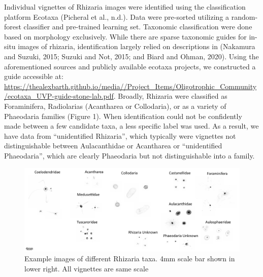 \documentclass[
]{article}
\begin{document}
Individual vignettes of Rhizaria images were identified using the
classification platform Ecotaxa (Picheral et al., n.d.). Data were
pre-sorted utilizing a random-forest classifier and pre-trained learning
set. Taxonomic classification were done based on morphology exclusively.
While there are sparse taxonomic guides for in-situ images of rhizaria,
identification largely relied on descriptions in (Nakamura and Suzuki,
2015; Suzuki and Not, 2015; and Biard and Ohman, 2020). Using the
aforementioned sources and publicly available ecotaxa projects, we
constructed a guide accessible at:
\url{https://thealexbarth.github.io/media//Project_Items/Oligotrophic_Community/ecotaxa_UVP-guide-stone-lab.pdf}.
Broadly, Rhizaria were classified as Foraminifera, Radiolarias
(Acantharea or Collodaria), or as a variety of Phaeodaria families
(Figure 1). When identification could not be confidently made between a
few candidate taxa, a less specific label was used. As a result, we have
data from ``unidentified Rhizaria'', which typically were vignettes not
distinguishable between Aulacanthidae or Acantharea or ``unidentified
Phaeodaria'', which are clearly Phaeodaria but not distinguishable into
a family.

\begin{figure}

{\centering \includegraphics{images/01_taxa.pdf}

}

\caption{Example images of different Rhizaria taxa. 4mm scale bar shown
in lower right. All vignettes are same scale}

\end{figure}
\end{document}

